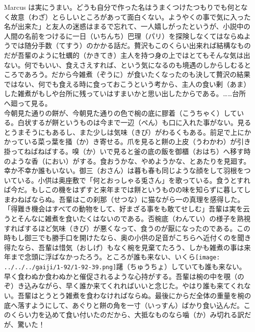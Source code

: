 \documentclass{book}
\begin{document}
Marcus
は実にうまい。どうも自分で作った名はうまくつけたつもりでも何となく故意（わざ）とらしいところがあって面白くない。ようやくの事で気に入った名が出来た」と友人の迷惑はまるで忘れて、一人嬉しがったというが、小説中の人間の名前をつけるに一日（いちんち）巴理（パリ）を探険しなくてはならぬようでは随分手数（てすう）のかかる話だ。贅沢もこのくらい出来れば結構なものだが吾輩のように牡蠣的（かきてき）主人を持つ身の上ではとてもそんな気は出ない。何でもいい、食えさえすれば、という気になるのも境遇のしからしむるところであろう。だから今雑煮（ぞうに）が食いたくなったのも決して贅沢の結果ではない、何でも食える時に食っておこうという考から、主人の食い剰（あま）した雑煮がもしや台所に残っていはすまいかと思い出したからである。\ldots{}\ldots{}台所へ廻って見る。\\
今朝見た通りの餅が、今朝見た通りの色で椀の底に膠着（こうちゃく）している。白状するが餅というものは今まで一辺（ぺん）も口に入れた事がない。見るとうまそうにもあるし、また少しは気味（きび）がわるくもある。前足で上にかかっている菜っ葉を掻（か）き寄せる。爪を見ると餅の上皮（うわかわ）が引き掛ってねばねばする。嗅（か）いで見ると釜の底の飯を御櫃（おはち）へ移す時のような香（におい）がする。食おうかな、やめようかな、とあたりを見廻す。幸か不幸か誰もいない。御三（おさん）は暮も春も同じような顔をして羽根をついている。小供は奥座敷で「何とおっしゃる兎さん」を歌っている。食うとすれば今だ。もしこの機をはずすと来年までは餅というものの味を知らずに暮してしまわねばならぬ。吾輩はこの刹那（せつな）に猫ながら一の真理を感得した。「得難き機会はすべての動物をして、好まざる事をも敢てせしむ」吾輩は実を云うとそんなに雑煮を食いたくはないのである。否椀底（わんてい）の様子を熟視すればするほど気味（きび）が悪くなって、食うのが厭になったのである。この時もし御三でも勝手口を開けたなら、奥の小供の足音がこちらへ近付くのを聞き得たなら、吾輩は惜気（おしげ）もなく椀を見棄てたろう、しかも雑煮の事は来年まで念頭に浮ばなかったろう。ところが誰も来ない、いくら\texttt{[image: ../../../gaiji/1-92/1-92-39.png]}躇（ちゅうちょ）していても誰も来ない。早く食わぬか食わぬかと催促されるような心持がする。吾輩は椀の中を覗（のぞ）き込みながら、早く誰か来てくれればいいと念じた。やはり誰も来てくれない。吾輩はとうとう雑煮を食わなければならぬ。最後にからだ全体の重量を椀の底へ落すようにして、あぐりと餅の角を一寸（いっすん）ばかり食い込んだ。このくらい力を込めて食い付いたのだから、大抵なものなら噛（か）み切れる訳だが、驚いた！ 
\end{document}
